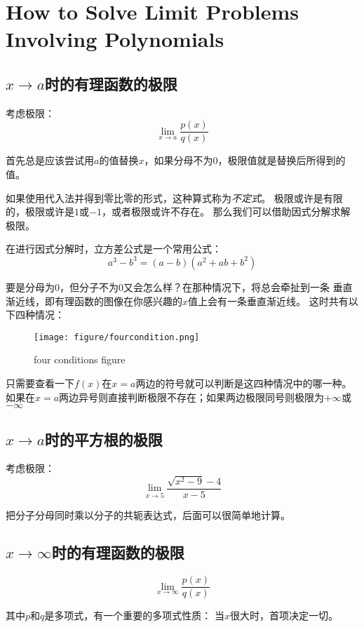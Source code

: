 \documentclass[11pt, b5paper, oneside]{book}
\begin{document}
\chapter{How to Solve Limit Problems Involving Polynomials}

\section{$x\rightarrow a$时的有理函数的极限}

考虑极限：
\[\lim\limits_{x\to a}\frac{p(x)}{q(x)}\]

首先总是应该尝试用$a$的值替换$x$，如果分母不为0，极限值就是替换后所得到的值。

如果使用代入法并得到零比零的形式，这种算式称为\emph{不定式}。
极限或许是有限的，极限或许是$1$或$-1$，或者极限或许不存在。
那么我们可以借助因式分解求解极限。

在进行因式分解时，立方差公式是一个常用公式：
\[a^3-b^3 = (a-b)(a^2+ab+b^2)\]

要是分母为0，但分子不为0又会怎么样？在那种情况下，将总会牵扯到一条
垂直渐近线，即有理函数的图像在你感兴趣的$x$值上会有一条垂直渐近线。
这时共有以下四种情况：

\begin{figure}[H]
    \centering
    \texttt{[image: figure/fourcondition.png]}
    \caption{four conditions figure}
\end{figure}

只需要查看一下$f(x)$在$x=a$两边的符号就可以判断是这四种情况中的哪一种。
如果在$x=a$两边异号则直接判断极限不存在；如果两边极限同号则极限为$+\infty$或$-\infty$

\section{$x\rightarrow a$时的平方根的极限}

考虑极限：
\[\lim\limits_{x\to 5}\frac{\sqrt{x^2-9}-4}{x-5}\]

把分子分母同时乘以分子的共轭表达式，后面可以很简单地计算。

\section{$x\rightarrow \infty$时的有理函数的极限}

\[\lim\limits_{x\to \infty}\frac{p(x)}{q(x)}\]

其中$p$和$q$是多项式，有一个重要的多项式性质：
当$x$很大时，首项决定一切。
\end{document}
